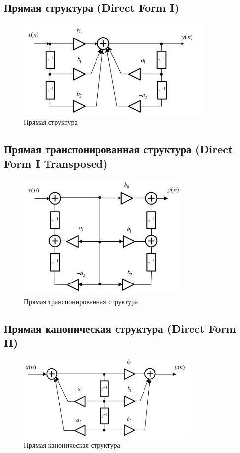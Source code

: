 \documentclass[a4paper, 14pt]{extarticle}
\begin{document}
\subsection{Прямая структура (Direct Form I)}
\begin{figure}[h]
    \centering
    \includegraphics[width=0.85\textwidth]{img/S003.jpg}
    \caption{Прямая структура}%
    \label{img:df1}
\end{figure}
\clearpage

\subsection{Прямая транспонированная структура (Direct Form I Transposed)}
\begin{figure}[h]
    \centering
    \includegraphics[width=0.75\textwidth]{img/S004.jpg}
    \caption{Прямая транспонированная структура}%
    \label{img:df1t}
\end{figure}

\subsection{Прямая каноническая структура (Direct Form II)}
\begin{figure}[h]
    \centering
    \includegraphics[width=0.8\textwidth]{img/S005.jpg}
    \caption{Прямая каноническая структура}%
    \label{img:df2}
\end{figure}
\clearpage
\end{document}
